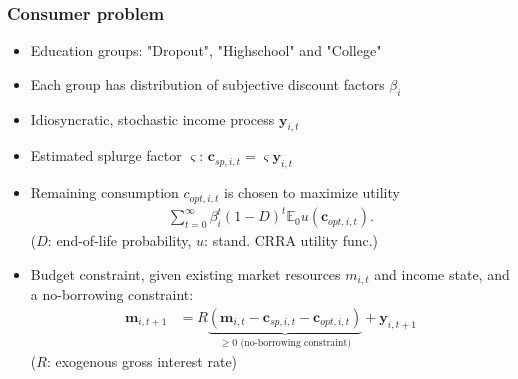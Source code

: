 \documentclass[pdflatex,aspectratio=169]{beamer}
\begin{document}
\begin{frame}
\frametitle{Consumer problem}


	\begin{itemize}
		\item Education groups: "Dropout", "Highschool" and "College"
		\item Each group has distribution of subjective discount factors $\beta_i$
		\item Idiosyncratic, stochastic income process $\mathbf{y}_{i,t}$
		\item Estimated splurge factor $\varsigma$: $\mathbf{c}_{sp,i,t} = \varsigma \mathbf{y}_{i,t}$
		\pause
		\item Remaining consumption $c_{opt,i,t}$ is chosen to maximize utility
			\begin{align}
			\sum_{t=0}^{\infty}\beta_i^t (1-D)^t \mathbb{E}_0 u(\mathbf{c}_{opt,i,t}).
			\end{align}
			($D$: end-of-life probability, $u$: stand. CRRA utility func.)	
		\item Budget constraint, given existing market resources $m_{i,t}$ and income state, and a no-borrowing constraint: 
		\begin{align}
		\mathbf{m}_{i,t+1} &= R \underbrace{(\mathbf{m}_{i,t} - \mathbf{c}_{sp,i,t} - \mathbf{c}_{opt,i,t})}_{\geq 0 \text{ (no-borrowing constraint)}} + \mathbf{y}_{i,t+1}
		\end{align}
		($R$: exogenous gross interest rate)
	\end{itemize}



\end{frame}
\end{document}
